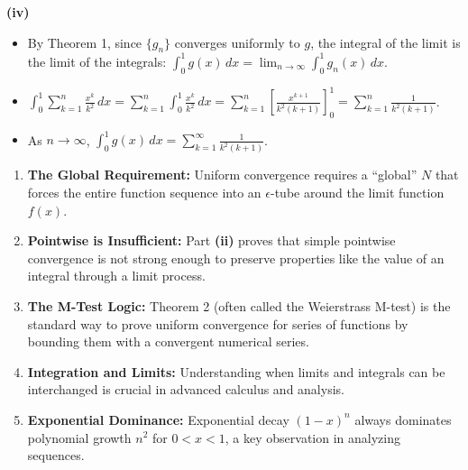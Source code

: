 \begin{solution}
\textbf{(iv)} 
\begin{itemize}
    \item By Theorem 1, since $\{g_n\}$ converges uniformly to $g$, the integral of the limit is the limit of the integrals:
    $\int_0^1 g(x) \, dx = \lim_{n \to \infty} \int_0^1 g_n(x) \, dx$.
    \item $\int_0^1 \sum_{k=1}^n \frac{x^k}{k^2} \, dx = \sum_{k=1}^n \int_0^1 \frac{x^k}{k^2} \, dx = \sum_{k=1}^n \left[ \frac{x^{k+1}}{k^2(k+1)} \right]_0^1 = \sum_{k=1}^n \frac{1}{k^2(k+1)}$.
    \item As $n \to \infty$, $\int_0^1 g(x) \, dx = \sum_{k=1}^\infty \frac{1}{k^2(k+1)}$.
\end{itemize}

\end{solution}

\begin{takeaways}
\begin{enumerate}
    \item \textbf{The Global Requirement:} Uniform convergence requires a ``global'' $N$ that forces the entire function sequence into an $\epsilon$-tube around the limit function $f(x)$.
    \item \textbf{Pointwise is Insufficient:} Part \textbf{(ii)} proves that simple pointwise convergence is not strong enough to preserve properties like the value of an integral through a limit process.
    \item \textbf{The M-Test Logic:} Theorem 2 (often called the Weierstrass M-test) is the standard way to prove uniform convergence for series of functions by bounding them with a convergent numerical series.
    \item \textbf{Integration and Limits:} Understanding when limits and integrals can be interchanged is crucial in advanced calculus and analysis.
    \item \textbf{Exponential Dominance:} Exponential decay $(1-x)^n$ always dominates polynomial growth $n^2$ for $0 < x < 1$, a key observation in analyzing sequences.
\end{enumerate}
\end{takeaways}
